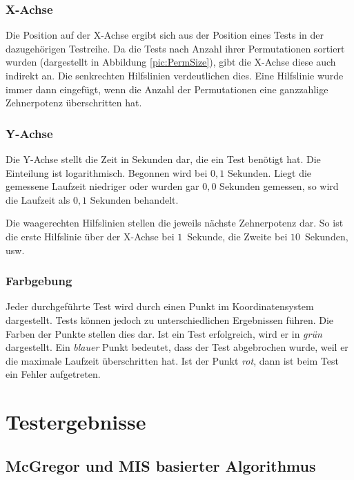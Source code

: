 \subsubsection{X-Achse}
Die Position auf der X-Achse ergibt sich aus der Position eines Tests in der 
dazugehörigen Testreihe. Da die Tests nach Anzahl ihrer Permutationen sortiert 
wurden (dargestellt in Abbildung \ref{pic:PermSize}), gibt die X-Achse diese auch 
indirekt an. Die senkrechten Hilfslinien verdeutlichen dies. Eine Hilfslinie wurde 
immer dann eingefügt, wenn die Anzahl der Permutationen eine ganzzahlige Zehnerpotenz 
überschritten hat. 

\subsubsection{Y-Achse}
Die Y-Achse stellt die Zeit in Sekunden dar, die ein Test benötigt hat. Die Einteilung 
ist logarithmisch. Begonnen wird bei $0{,}1$ Sekunden. Liegt die gemessene Laufzeit niedriger oder 
wurden gar $0{,}0$ Sekunden gemessen, so wird die Laufzeit als $0{,}1$ Sekunden behandelt. 

Die waagerechten Hilfslinien stellen die jeweils nächste Zehnerpotenz dar. So ist die 
erste Hilfslinie über der X-Achse bei $1$~Sekunde, die Zweite bei $10$~Sekunden, usw. 

\subsubsection{Farbgebung}
Jeder durchgeführte Test wird durch einen Punkt im Koordinatensystem dargestellt. Tests 
können jedoch zu unterschiedlichen Ergebnissen führen. Die Farben der Punkte stellen dies 
dar. Ist ein Test erfolgreich, wird er in \emph{grün} dargestellt. Ein \emph{blauer} 
Punkt bedeutet, dass der Test abgebrochen wurde, weil er die maximale Laufzeit 
überschritten hat. Ist der Punkt \emph{rot}, dann ist beim Test ein Fehler aufgetreten. 


\section{Testergebnisse}

\subsection{McGregor und MIS basierter Algorithmus}

